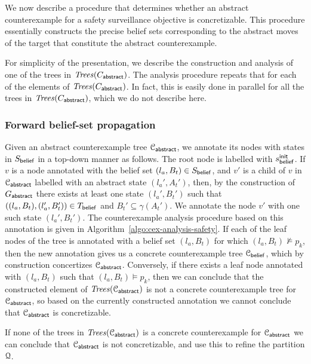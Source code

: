 We now describe a procedure that determines whether an abstract counterexample for a safety surveillance objective is concretizable. This procedure essentially constructs the precise belief sets corresponding to the abstract moves of the target that constitute the abstract counterexample.

For simplicity of the presentation, we describe the construction and analysis of one of the trees in $\mathit{Trees}(C_{\mathsf{abstract}})$. The analysis procedure repeats that for each of the elements of $\mathit{Trees}(C_{\mathsf{abstract}})$. In fact, this is easily done in parallel for all the trees in $\mathit{Trees}(C_{\mathsf{abstract}})$, which we do not describe here.

\bigskip

\subsubsection{Forward belief-set propagation}
Given an abstract counterexample tree $\mathcal{C}_{\mathsf{abstract}}$, we annotate its nodes with states in $S_{\mathsf{belief}}$ in a top-down manner as follows. 
The root node is labelled with $s_{\mathsf{belief}}^{\mathsf{init}}$. 
If $v$ is a node annotated with the belief set $(l_a,B_t) \in S_{\mathsf{belief}}$, and  $v'$ is a child of $v$ in $\mathcal{C}_{\mathsf{abstract}}$ labelled with an abstract state $(l_a',A_t')$, then, by the construction of $G_{\mathsf{abstract}}$ there exists at least one state $(l_a',B_t')$ such that $((l_a,B_t),(l_a',B_t')) \in T_{\mathsf{belief}}$ and $B_t' \subseteq \gamma(A_t')$. We annotate the node $v'$ with one such state $(l_a',B_t')$. The counterexample analysis procedure based on this annotation is given in Algorithm~\ref{algo:cex-analysis-safety}.
If each of the leaf nodes of the tree is annotated with a belief set $(l_a,B_t)$ for which $(l_a,B_t) \not\models p_k$, then the new annotation gives us a concrete counterexample tree $\mathcal{C}_{\mathsf{belief}}$, which by construction concertizes $\mathcal{C}_{\mathsf{abstract}}$. Conversely, if there exists a leaf node annotated with $(l_a,B_t)$ such that $(l_a,B_t) \models p_k$, then we can conclude that the constructed element of $\mathit{Trees}(\mathcal{C}_{\mathsf{abstract}})$ is not a concrete counterexample tree  for $\mathcal{C}_{\mathsf{abstract}}$, so based on the currently constructed annotation we cannot conclude that $\mathcal{C}_{\mathsf{abstract}}$ is concretizable.  

If none of the trees in $\mathit{Trees}(\mathcal{C}_{\mathsf{abstract}})$ is a concrete counterexample for $\mathcal{C}_{\mathsf{abstract}}$ we can conclude that $\mathcal{C}_{\mathsf{abstract}}$ is not concretizable, and use this to refine the partition $\mathcal{Q}$.

